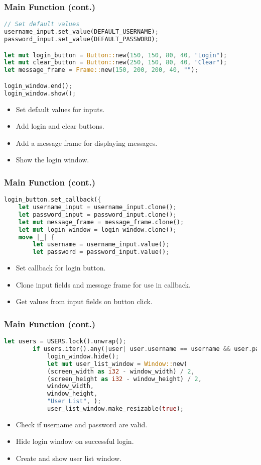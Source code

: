 \documentclass[aspectratio=169, table]{beamer}
\begin{document}
\begin{frame}[fragile]
\frametitle{Main Function (cont.)}
\vspace{15pt}
\begin{lstlisting}[language=Rust]
// Set default values
username_input.set_value(DEFAULT_USERNAME);
password_input.set_value(DEFAULT_PASSWORD);

let mut login_button = Button::new(150, 150, 80, 40, "Login");
let mut clear_button = Button::new(250, 150, 80, 40, "Clear");
let message_frame = Frame::new(150, 200, 200, 40, "");

login_window.end();
login_window.show();
\end{lstlisting}
\begin{itemize}
\item Set default values for inputs.
\item Add login and clear buttons.
\item Add a message frame for displaying messages.
\item Show the login window.
\end{itemize}
\end{frame}

\begin{frame}[fragile]
\frametitle{Main Function (cont.)}
\begin{lstlisting}[language=Rust]
login_button.set_callback({
	let username_input = username_input.clone();
	let password_input = password_input.clone();
	let mut message_frame = message_frame.clone();
	let mut login_window = login_window.clone();
	move |_| {
		let username = username_input.value();
		let password = password_input.value();
	\end{lstlisting}
	\begin{itemize}
		\item Set callback for login button.
		\item Clone input fields and message frame for use in callback.
		\item Get values from input fields on button click.
	\end{itemize}
\end{frame}

\begin{frame}[fragile]
	\frametitle{Main Function (cont.)}
	\vspace{15pt}
	\begin{lstlisting}[language=Rust]
		let users = USERS.lock().unwrap();
		if users.iter().any(|user| user.username == username && user.password == password) {
			login_window.hide();
			let mut user_list_window = Window::new(
			(screen_width as i32 - window_width) / 2,
			(screen_height as i32 - window_height) / 2,
			window_width,
			window_height,
			"User List", );
			user_list_window.make_resizable(true);
		\end{lstlisting}
		\begin{itemize}
			\item Check if username and password are valid.
			\item Hide login window on successful login.
			\item Create and show user list window.
		\end{itemize}
	\end{frame}
	
\end{document}
